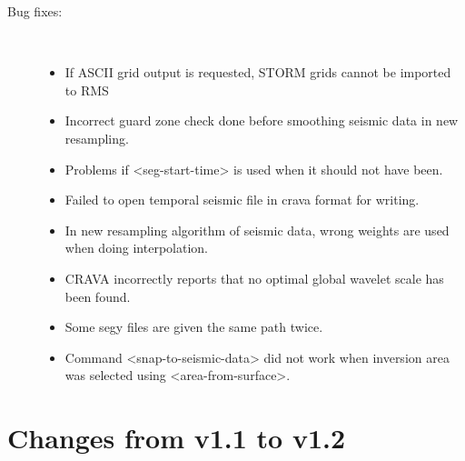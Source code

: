 \begin{description}
\item [Bug fixes:] \mbox{ }
  \begin{itemize}
  \item If ASCII grid output is requested, STORM grids cannot be imported to RMS 
    \item Incorrect guard zone check done before smoothing seismic data in new resampling. 
    \item Problems if <seg-start-time> is used when it should not have been. 
    \item Failed to open temporal seismic file in crava format for writing. 
    \item In new resampling algorithm of seismic data, wrong weights are used when doing interpolation. 
    \item CRAVA incorrectly reports that no optimal global wavelet scale has been found. 
    \item Some segy files are given the same path twice. 
    \item Command <snap-to-seismic-data> did not work when inversion area was selected using <area-from-surface>. 
  \end{itemize}
\end{description}

\section{Changes from v1.1 to v1.2}

